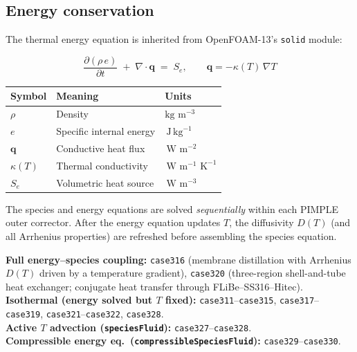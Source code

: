 \documentclass[11pt,a4paper]{article}
\newcommand{\pder}[2]{\frac{\partial #1}{\partial #2}}
\newcommand{\m}{\,\text{m}}
\newcommand{\K}{\,\text{K}}
\newcommand{\J}{\,\text{J}}
\newcommand{\W}{\,\text{W}}
\newcommand{\caseref}[1]{\texttt{\color{casegreen}#1}}
\begin{document}
\subsection{Energy conservation}
\label{sec:energy}

The thermal energy equation is inherited from OpenFOAM-13's \texttt{solid}
module:

\begin{tcolorbox}[eqbox,title={Energy equation (Fourier conduction)}]
\begin{equation}\label{eq:energy}
  \pder{(\rho\, e)}{t}
  \;+\; \nabla\cdot\mathbf{q}
  \;=\; S_e,
  \qquad
  \mathbf{q} = -\kappa(T)\,\nabla T
\end{equation}
\end{tcolorbox}

\begin{center}
\begin{tabular}{lll}
\toprule
Symbol & Meaning & Units \\
\midrule
$\rho$     & Density                     & $\text{kg}\,\m^{-3}$ \\
$e$        & Specific internal energy     & $\J\,\text{kg}^{-1}$ \\
$\mathbf{q}$ & Conductive heat flux       & $\W\,\m^{-2}$ \\
$\kappa(T)$ & Thermal conductivity        & $\W\,\m^{-1}\,\K^{-1}$ \\
$S_e$      & Volumetric heat source       & $\W\,\m^{-3}$ \\
\bottomrule
\end{tabular}
\end{center}

The species and energy equations are solved \emph{sequentially} within each
PIMPLE outer corrector.  After the energy equation updates $T$, the
diffusivity $D(T)$ (and all Arrhenius properties) are refreshed before
assembling the species equation.

\begin{tcolorbox}[casebox]
  \textbf{Full energy–species coupling:}
  \caseref{case316} (membrane distillation with Arrhenius $D(T)$ driven by a
  temperature gradient), \caseref{case320} (three-region shell-and-tube
  heat exchanger; conjugate heat transfer through FLiBe–SS316–Hitec).\\
  \textbf{Isothermal (energy solved but $T$ fixed):}
  \caseref{case311}–\caseref{case315}, \caseref{case317}–\caseref{case319},
  \caseref{case321}–\caseref{case322}, \caseref{case328}.\\
  \textbf{Active $T$ advection (\texttt{speciesFluid}):}
  \caseref{case327}–\caseref{case328}.\\
  \textbf{Compressible energy eq.\ (\texttt{compressibleSpeciesFluid}):}
  \caseref{case329}–\caseref{case330}.
\end{tcolorbox}
\end{document}
